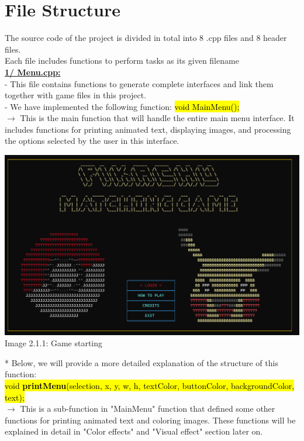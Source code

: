 \documentclass[12pt,a4paper]{report}
\begin{document}
\section{File Structure}
The source code of the project is divided in total into 8 .cpp files and 8 header files.\\
Each file includes functions to perform tasks as its given filename\\[0.4cm]
\hspace{-0.6cm}\textbf{\underline{1/ Menu.cpp:}}\\[0.2cm]
- This file contains functions to generate complete interfaces and link them together with game files in this project.\\
- We have implemented the following function: \hl{void MainMenu();}\\
$\rightarrow$ This is the main function that will handle the entire main menu interface. It includes functions for printing animated text, displaying images, and processing the options selected by the user in this interface.
\begin{center}
    \includegraphics[scale=0.3]{Main Menu.png}\\[0.2cm]
    Image 2.1.1: Game starting
\end{center}
* Below, we will provide a more detailed explanation of the structure of this function:\\[0.2cm]
\hl{void \textbf{printMenu}(selection, x, y, w, h, textColor, buttonColor, backgroundColor, text);}\\
 $\rightarrow$ This is a sub-function in "MainMenu" function that defined some other functions for printing animated text and coloring images. These functions will be explained in detail in "Color effects" and "Visual effect" section later on.\\[0.2cm]
\end{document}
